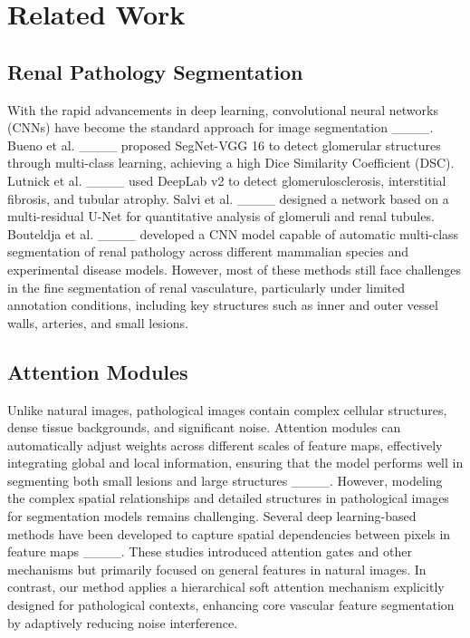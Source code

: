 \section{Related Work}
\subsection{Renal Pathology Segmentation}
\label{sec:title}
With the rapid advancements in deep learning, convolutional neural networks (CNNs) have become the standard approach for image segmentation ____. Bueno et al. ____ proposed SegNet-VGG 16 to detect glomerular structures through multi-class learning, achieving a high Dice Similarity Coefficient (DSC). Lutnick et al. ____ used DeepLab v2 to detect glomerulosclerosis, interstitial fibrosis, and tubular atrophy. Salvi et al. ____ designed a network based on a multi-residual U-Net for quantitative analysis of glomeruli and renal tubules. Bouteldja et al. ____ developed a CNN model capable of automatic multi-class segmentation of renal pathology across different mammalian species and experimental disease models. However, most of these methods still face challenges in the fine segmentation of renal vasculature, particularly under limited annotation conditions, including key structures such as inner and outer vessel walls, arteries, and small lesions.

\subsection{Attention Modules}
\label{sec:title}
Unlike natural images, pathological images contain complex cellular structures, dense tissue backgrounds, and significant noise. Attention modules can automatically adjust weights across different scales of feature maps, effectively integrating global and local information, ensuring that the model performs well in segmenting both small lesions and large structures ____. However, modeling the complex spatial relationships and detailed structures in pathological images for segmentation models remains challenging. Several deep learning-based methods have been developed to capture spatial dependencies between pixels in feature maps ____. These studies introduced attention gates and other mechanisms but primarily focused on general features in natural images. In contrast, our method applies a hierarchical soft attention mechanism explicitly designed for pathological contexts, enhancing core vascular feature segmentation by adaptively reducing noise interference.

